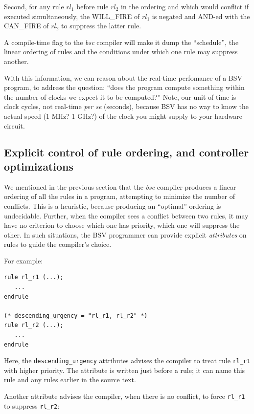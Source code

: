 Second, for any rule $rl_1$ before rule $rl_2$ in the ordering and
which would conflict if executed simultaneously, the WILL\_FIRE of
$rl_1$ is negated and AND-ed with the CAN\_FIRE of $rl_2$ to suppress
the latter rule.

A compile-time flag to the \emph{bsc} compiler will make it dump the
``schedule'', {\ie} the linear ordering of rules and the conditions
under which one rule may suppress another.

With this information, we can reason about the real-time perfomance of
a BSV program, {\ie} to address the question: ``does the program
compute something within the number of clocks we expect it to be
computed?''  Note, our unit of time is clock cycles, not real-time
\emph{per se} (seconds), because BSV has no way to know the actual
speed (1 MHz?  1 GHz?) of the clock you might supply to your hardware
circuit.


\subsection{Explicit control of rule ordering, and controller optimizations}

We mentioned in the previous section that the \emph{bsc} compiler
produces a linear ordering of all the rules in a program, attempting
to minimize the number of conflicts.  This is a heuristic, because
producing an ``optimal'' ordering is undecidable.  Further, when the
compiler sees a conflict between two rules, it may have no criterion
to choose which one has priority, {\ie} which one will suppress the
other.  In such situations, the BSV programmer can provide explicit
\emph{attributes} on rules to guide the compiler's choice.

For example:

{\small
\begin{Verbatim}[frame=single,label=BSV]
rule rl_r1 (...);
   ...
endrule

(* descending_urgency = "rl_r1, rl_r2" *)
rule rl_r2 (...);
   ...
endrule
\end{Verbatim}
}

Here, the \verb|descending_urgency| attributes advises the compiler to
treat rule \verb|rl_r1| with higher priority.  The attribute is
written just before a rule; it can name this rule and any rules
earlier in the source text.

Another attribute advises the compiler, when there is no conflict, to
force \verb|rl_r1| to suppress \verb|rl_r2|:

